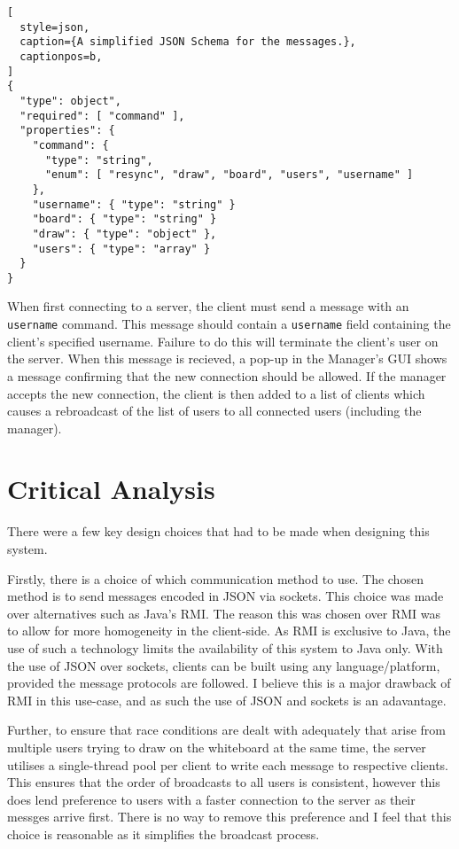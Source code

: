 \documentclass[12pt]{article}
\begin{document}
\begin{lstlisting}[
  style=json, 
  caption={A simplified JSON Schema for the messages.},
  captionpos=b,
]
{
  "type": object",
  "required": [ "command" ],
  "properties": {
    "command": {
      "type": "string",
      "enum": [ "resync", "draw", "board", "users", "username" ]
    },
    "username": { "type": "string" }
    "board": { "type": "string" }
    "draw": { "type": "object" },
    "users": { "type": "array" }
  }
}
\end{lstlisting}

When first connecting to a server, the client must send a message with an \texttt{username} command. This message should contain a \texttt{username} field containing the client's specified username. Failure to do this will terminate the client's user on the server. When this message is recieved, a pop-up in the Manager's GUI shows a message confirming that the new connection should be allowed. If the manager accepts the new connection, the client is then added to a list of clients which causes a rebroadcast of the list of users to all connected users (including the manager).

\newpage

\section{Critical Analysis}
There were a few key design choices that had to be made when designing this system. 

Firstly, there is a choice of which communication method to use. The chosen method is to send messages encoded in JSON via sockets. This choice was made over alternatives such as Java's RMI. The reason this was chosen over RMI was to allow for more homogeneity in the client-side. As RMI is exclusive to Java, the use of such a technology limits the availability of this system to Java only. With the use of JSON over sockets, clients can be built using any language/platform, provided the message protocols are followed. I believe this is a major drawback of RMI in this use-case, and as such the use of JSON and sockets is an adavantage. 

Further, to ensure that race conditions are dealt with adequately that arise from multiple users trying to draw on the whiteboard at the same time, the server utilises a single-thread pool per client to write each message to respective clients. This ensures that the order of broadcasts to all users is consistent, however this does lend preference to users with a faster connection to the server as their messges arrive first. There is no way to remove this preference and I feel that this choice is reasonable as it simplifies the broadcast process.
\end{document}
